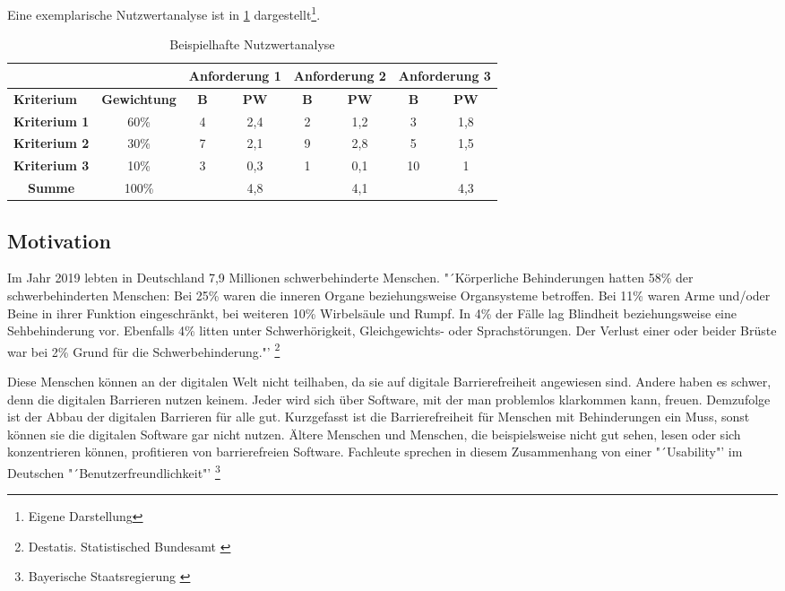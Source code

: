Eine exemplarische Nutzwertanalyse ist in \cref{table:Beispielhafte Nutzwertanalyse} dargestellt\footnote{Eigene Darstellung}.

\begin{table}[H]
\caption[Beispielhafte Nutzwertanalyse]{Beispielhafte Nutzwertanalyse}
\vspace{0,1cm}
\begin{tabular}{cc|c|c|c|c|c|c|}
	\cline{3-8}
	& & \multicolumn{2}{c|}{\textbf{Anforderung 1}} & \multicolumn{2}{c|}{\textbf{Anforderung 2}} & \multicolumn{2}{c|}{\textbf{Anforderung 3}} \\ \hline
	\multicolumn{1}{|l|}{\textbf{Kriterium}} & \textbf{Gewichtung} & \textbf{B} & \textbf{PW} & \textbf{B} & \textbf{PW} & \textbf{B} & \textbf{PW} \\ \hline
	\multicolumn{1}{|l|}{\textbf{Kriterium 1}} & 60\%  & 4 & 2,4 & 2 & 1,2 & 3  & 1,8 \\ \hline
	\multicolumn{1}{|l|}{\textbf{Kriterium 2}} & 30\%  & 7 & 2,1 & 9 & 2,8 & 5  & 1,5 \\ \hline
	\multicolumn{1}{|l|}{\textbf{Kriterium 3}} & 10\%  & 3 & 0,3 & 1 & 0,1 & 10 & 1   \\ \hline
	\multicolumn{1}{|c|}{\textbf{Summe}}       & 100\% &   & 4,8 &   & 4,1 &    & 4,3 \\ \cline{1-2} \cline{4-4} \cline{6-6} \cline{8-8} 
\end{tabular}
\label{table:Beispielhafte Nutzwertanalyse}
\end{table}

\subsection{Motivation}

Im Jahr 2019 lebten in Deutschland 7,9 Millionen schwerbehinderte Menschen. "´Körperliche Behinderungen hatten 58\% der schwerbehinderten Menschen: Bei 25\% waren die inneren Organe beziehungsweise Organsysteme betroffen. Bei 11\% waren Arme und/oder Beine in ihrer Funktion eingeschränkt, bei weiteren 10\% Wirbelsäule und Rumpf. In 4\% der Fälle lag Blindheit beziehungsweise eine Sehbehinderung vor. Ebenfalls 4\% litten unter Schwerhörigkeit, Gleichgewichts- oder Sprachstörungen. Der Verlust einer oder beider Brüste war bei 2\% Grund für die Schwerbehinderung."' \footnote{Destatis. Statistisched Bundesamt \cite{DESTATIS}}

Diese Menschen können an der digitalen Welt nicht teilhaben, da sie auf digitale Barrierefreiheit angewiesen sind. Andere haben es schwer, denn die digitalen Barrieren nutzen keinem. Jeder wird sich über Software, mit der man problemlos klarkommen kann, freuen. Demzufolge ist der Abbau der digitalen Barrieren für alle gut. Kurzgefasst ist die Barrierefreiheit für Menschen mit Behinderungen ein Muss, sonst können sie die digitalen Software gar nicht nutzen. Ältere Menschen und Menschen, die beispielsweise nicht gut sehen, lesen oder sich konzentrieren können, profitieren von barrierefreien Software. Fachleute sprechen in diesem Zusammenhang von einer "´Usability"' im Deutschen "´Benutzerfreundlichkeit"' \footnote{Bayerische Staatsregierung \cite{BS}}
\\
